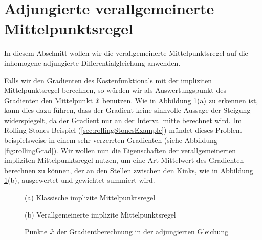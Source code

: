 \section{Adjungierte verallgemeinerte Mittelpunktsregel}

In diesem Abschnitt wollen wir die verallgemeinerte Mittelpunktsregel auf die inhomogene adjungierte Differentialgleichung anwenden.

Falls wir den Gradienten des Kostenfunktionals mit der impliziten Mittelpunktsregel berechnen, so würden wir als Auswertungspunkt des Gradienten den Mittelpunkt $\mathring{x}$ benutzen. Wie in Abbildung \ref{fig:multipleKinksAdjoint}(a) zu erkennen ist, kann dies dazu führen, dass der Gradient keine sinnvolle Aussage der Steigung widerspiegelt, da der Gradient nur an der Intervallmitte berechnet wird. Im Rolling Stones Beispiel (\ref{sec:rollingStonesExample}) mündet dieses Problem beispielsweise in einem sehr verzerrten Gradienten (siehe Abbildung \ref{fig:rollingGrad}). Wir wollen nun die Eigenschaften der verallgemeinerten impliziten Mittelpunktsregel nutzen, um eine Art Mittelwert des Gradienten berechnen zu können, der an den Stellen zwischen den Kinks, wie in Abbildung \ref{fig:multipleKinksAdjoint}(b), ausgewertet und gewichtet summiert wird. 

\begin{figure}
\footnotesize
\centering
\begin{minipage}[b]{\linewidth}

\caption*{(a) Klassische implizite Mittelpunktsregel}
\end{minipage}
\begin{minipage}[b]{\linewidth}

\caption*{(b) Verallgemeinerte implizite Mittelpunktsregel}
\end{minipage}
\caption{Punkte $\mathring{x}$ der Gradientberechnung in der adjungierten Gleichung}
\label{fig:multipleKinksAdjoint}
\end{figure}


